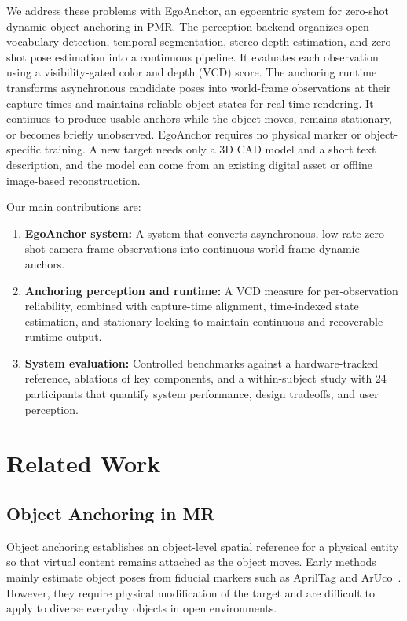 \documentclass[review]{vgtc}
\begin{document}
We address these problems with EgoAnchor, an egocentric system for zero-shot dynamic object anchoring in PMR. The perception backend organizes open-vocabulary detection, temporal segmentation, stereo depth estimation, and zero-shot pose estimation into a continuous pipeline. It evaluates each observation using a visibility-gated color and depth (VCD) score. The anchoring runtime transforms asynchronous candidate poses into world-frame observations at their capture times and maintains reliable object states for real-time rendering. It continues to produce usable anchors while the object moves, remains stationary, or becomes briefly unobserved. EgoAnchor requires no physical marker or object-specific training. A new target needs only a 3D CAD model and a short text description, and the model can come from an existing digital asset or offline image-based reconstruction.

Our main contributions are:
\begin{enumerate}[leftmargin=1.8em,itemsep=1pt,topsep=2pt]
  \item \textbf{EgoAnchor system:} A system that converts asynchronous, low-rate zero-shot camera-frame observations into continuous world-frame dynamic anchors.
  \item \textbf{Anchoring perception and runtime:} A VCD measure for per-observation reliability, combined with capture-time alignment, time-indexed state estimation, and stationary locking to maintain continuous and recoverable runtime output.
  \item \textbf{System evaluation:} Controlled benchmarks against a hardware-tracked reference, ablations of key components, and a within-subject study with 24 participants that quantify system performance, design tradeoffs, and user perception.
\end{enumerate}

\section{Related Work}\label{sec:related-work}

\subsection{Object Anchoring in MR}

Object anchoring establishes an object-level spatial reference for a physical entity so that virtual content remains attached as the object moves. Early methods mainly estimate object poses from fiducial markers such as AprilTag and ArUco~\cite{apriltag2011,aruco2014}. However, they require physical modification of the target and are difficult to apply to diverse everyday objects in open environments.
\end{document}
